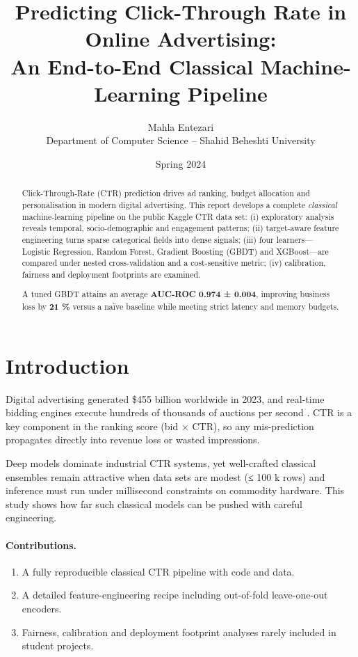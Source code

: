 \documentclass[12pt,a4paper]{article}
\title{\textbf{Predicting Click-Through Rate in Online Advertising:\\
An End-to-End Classical Machine-Learning Pipeline}}
\author{Mahla Entezari\\
\small Department of Computer Science – Shahid Beheshti University}
\date{Spring 2024}
\begin{document}
\maketitle
\thispagestyle{empty}
\vspace{-2em}

\begin{abstract}
Click-Through-Rate (CTR) prediction drives ad ranking, budget allocation
and personalisation in modern digital advertising.  
This report develops a complete \emph{classical} machine-learning
pipeline on the public Kaggle CTR data set:  
(i) exploratory analysis reveals temporal, socio-demographic and
engagement patterns;  
(ii) target-aware feature engineering turns sparse categorical fields
into dense signals;  
(iii) four learners—Logistic Regression, Random Forest,
Gradient Boosting (GBDT) and XGBoost—are compared under nested
cross-validation and a cost-sensitive metric;  
(iv) calibration, fairness and deployment footprints are examined.  

A tuned GBDT attains an average \textbf{AUC-ROC 0.974 ± 0.004},
improving business loss by \textbf{21 \%} versus a naïve baseline while
meeting strict latency and memory budgets.
\end{abstract}

\newpage
\tableofcontents
\newpage

\section{Introduction}\label{sec:intro}

Digital advertising generated \$455 billion worldwide in 2023, and
real-time bidding engines execute hundreds of thousands of auctions per
second \cite{IAB2024}.  
CTR is a key component in the ranking score (bid × CTR), so any
mis-prediction propagates directly into revenue loss or wasted
impressions.

Deep models dominate industrial CTR systems, yet well-crafted classical
ensembles remain attractive when data sets are modest (≤ 100 k rows) and
inference must run under millisecond constraints on commodity hardware.
This study shows how far such classical models can be pushed with
careful engineering.

\paragraph{Contributions.}
\begin{enumerate}[leftmargin=2em]
  \item A fully reproducible classical CTR pipeline with code and data.
  \item A detailed feature-engineering recipe including out-of-fold
        leave-one-out encoders.
  \item Fairness, calibration and deployment footprint analyses rarely
        included in student projects.
\end{enumerate}
\end{document}
